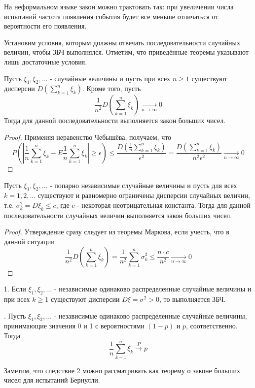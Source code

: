 На неформальном языке закон можно трактовать так: при увеличении числа испытаний частота появления события будет все меньше отличаться от вероятности его появления.

Установим условия, которым должны отвечать последовательности случайных величин, чтобы ЗБЧ выполнялся. Отметим, что приведённые теоремы указывают лишь достаточные условия.

\begin{theorem}
	Пусть $\xi_1, \xi_2, \dots$ - случайные величины и пусть при всех $n \ge 1$ существуют дисперсии $D \left( \sum\limits_{k=1}^{n} \xi_k \right)$. Кроме того, пусть
	\[ \frac{1}{n^2} D \left( \sum\limits_{k=1}^{n} \xi_k \right) \underset{n \to \infty}{\to} 0 \]
	Тогда для данной последовательности выполняется закон больших чисел.
	\begin{proof}
		Применяя неравенство Чебышёва, получаем, что
		\[
		P \left( \left| \frac{1}{n} \sum_{k=1}^{n} \xi_k - E \frac{1}{n} \sum_{k=1}^{n} \xi_k \right| \ge \epsilon \right) \le \frac{D \left( \frac{1}{n} \sum\limits_{k=1}^{n} \xi_k \right)}{\epsilon^2} = \frac{D \left( \sum\limits_{k=1}^{n} \xi_k \right)}{n^2 \epsilon^2} \underset{n \to \infty}{\to} 0
		\]
	\end{proof}
\end{theorem}

\begin{theorem}
	Пусть $\xi_1, \xi_2, \dots$ - попарно независимые случайные величины и пусть для всех $k = 1, 2, \dots$ существуют и равномерно ограничены дисперсии случайных величин, т.е. $\sigma_k^2 = D\xi_k \le c$, где $c$ - некоторая неотрицательная константа. Тогда для данной последовательности случайных величин выполняется закон больших чисел.
	\begin{proof}
		Утверждение сразу следует из теоремы Маркова, если учесть, что в данной ситуации
		\[ \frac{1}{n^2} D \left( \sum_{k=1}^{n} \xi_k \right) = \frac{1}{n^2} \sum_{k=1}^{n} \sigma_k^2 \le \frac{n \cdot c}{n^2} \underset{n \to \infty}{\to} 0 \]
	\end{proof}
\end{theorem}

\begin{corollary}
	
	1. Если $\xi_1, \xi_2, \dots$ - независимые одинаково распределенные случайные величины и при всех $k \ge 1$ существуют дисперсии $D\xi = \sigma^2 > 0$, то выполняется ЗБЧ.
	
	. Пусть $\xi_1, \xi_2, \dots$ - независимые одинаково распределенные случайные величины, принимающие значения 0 и 1 с вероятностями $(1-p)$ и $p$, соответственно. Тогда
	\[ \frac{1}{n} \sum_{k-1}^{n} \xi_k \overset{P}{\to} p \]
	
	Заметим, что следствие 2 можно рассматривать как теорему о законе больших чисел для испытаний Бернулли.
\end{corollary}

